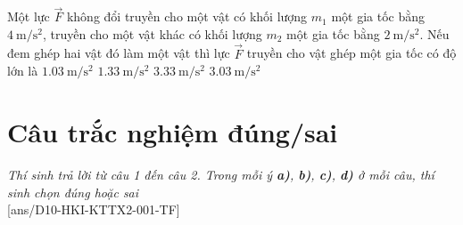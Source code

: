 \begin{ex}
	Một lực $\vec{F}$ không đổi truyền cho một vật có khối lượng $m_1$ một gia tốc bằng $\SI{4}{\meter/\second^2}$, truyền cho một vật khác có khối lượng $m_2$ một gia tốc bằng $\SI{2}{\meter/\second^2}$. Nếu đem ghép hai vật đó làm một vật thì lực $\vec{F}$ truyền cho vật ghép một gia tốc có độ lớn là
	\choice
	{$\SI{1.03}{\meter/\second^2}$}
	{\True $\SI{1.33}{\meter/\second^2}$}
	{$\SI{3.33}{\meter/\second^2}$}
	{$\SI{3.03}{\meter/\second^2}$}
	\loigiai{}
\end{ex}
\section{Câu trắc nghiệm đúng/sai} 
\textit{Thí sinh trả lời từ câu 1 đến câu 2. Trong mỗi ý \textbf{a)}, \textbf{b)}, \textbf{c)}, \textbf{d)} ở mỗi câu, thí sinh chọn đúng hoặc sai}
\setcounter{ex}{0}\\
[ans/D10-HKI-KTTX2-001-TF]
